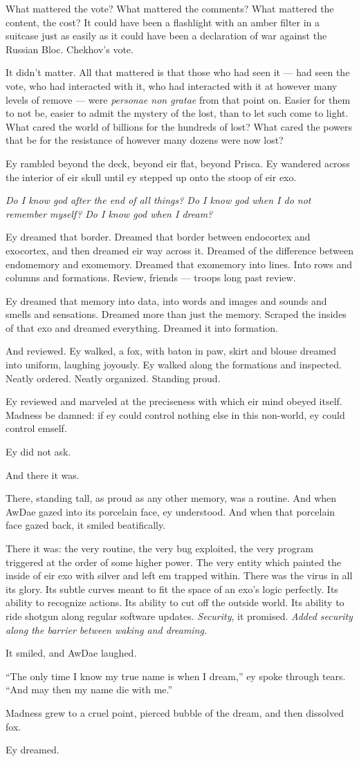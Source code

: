 What mattered the vote? What mattered the comments? What mattered the content, the cost? It could have been a flashlight with an amber filter in a suitcase just as easily as it could have been a declaration of war against the Russian Bloc. Chekhov's vote.

It didn't matter. All that mattered is that those who had seen it — had seen the vote, who had interacted with it, who had interacted with it at however many levels of remove — were \emph{personae non gratae} from that point on. Easier for them to not be, easier to admit the mystery of the lost, than to let such come to light. What cared the world of billions for the hundreds of lost? What cared the powers that be for the resistance of however many dozens were now lost?

Ey rambled beyond the deck, beyond eir flat, beyond Prisca. Ey wandered across the interior of eir skull until ey stepped up onto the stoop of eir exo.

\emph{Do I know god after the end of all things? Do I know god when I do not remember myself? Do I know god when I dream?}

Ey dreamed that border. Dreamed that border between endocortex and exocortex, and then dreamed eir way across it. Dreamed of the difference between endomemory and exomemory. Dreamed that exomemory into lines. Into rows and columns and formations. Review, friends — troops long past review.

Ey dreamed that memory into data, into words and images and sounds and smells and sensations. Dreamed more than just the memory. Scraped the insides of that exo and dreamed everything. Dreamed it into formation.

And reviewed. Ey walked, a fox, with baton in paw, skirt and blouse dreamed into uniform, laughing joyously. Ey walked along the formations and inspected. Neatly ordered. Neatly organized. Standing proud.

Ey reviewed and marveled at the preciseness with which eir mind obeyed itself. Madness be damned: if ey could control nothing else in this non-world, ey could control emself.

Ey did not ask.

And there it was.

There, standing tall, as proud as any other memory, was a routine. And when AwDae gazed into its porcelain face, ey understood. And when that porcelain face gazed back, it smiled beatifically.

There it was: the very routine, the very bug exploited, the very program triggered at the order of some higher power. The very entity which painted the inside of eir exo with silver and left em trapped within. There was the virus in all its glory. Its subtle curves meant to fit the space of an exo's logic perfectly. Its ability to recognize actions. Its ability to cut off the outside world. Its ability to ride shotgun along regular software updates. \emph{Security}, it promised. \emph{Added security along the barrier between waking and dreaming.}

It smiled, and AwDae laughed.

``The only time I know my true name is when I dream,'' ey spoke through tears. ``And may then my name die with me.''

Madness grew to a cruel point, pierced bubble of the dream, and then dissolved fox.

Ey dreamed.
